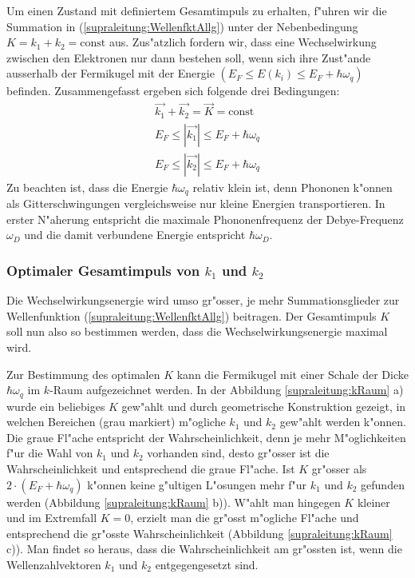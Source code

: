 \begin{refsection}
Um einen Zustand mit definiertem Gesamtimpuls zu erhalten, f"uhren wir die Summation in
(\ref{supraleitung:WellenfktAllg}) unter der Nebenbedingung $K=k_1+k_2=\text{const}$ aus.
Zus"atzlich fordern wir, dass eine Wechselwirkung zwischen den Elektronen nur dann bestehen soll,
wenn sich ihre Zust"ande ausserhalb der Fermikugel mit der Energie
$(E_F \le E(k_i) \le E_F+\hbar\omega_q)$ befinden.
Zusammengefasst ergeben sich folgende drei Bedingungen:
\begin{gather}
\overrightarrow{k_1}+\overrightarrow{k_2}=\overrightarrow{K}=\text{const}
\label{supraleitung:BedingungConst}\\
E_F\le|\overrightarrow{k_1}|\le E_F+\hbar\omega_q
\label{supraleitung:BedingungK1}\\
E_F\le|\overrightarrow{k_2}|\le E_F+\hbar\omega_q
\label{supraleitung:BedingungK2}
\end{gather}
Zu beachten ist, dass die Energie $\hbar \omega_q$ relativ klein ist, denn Phononen k"onnen als Gitterschwingungen vergleichsweise
nur kleine Energien transportieren.
In erster N"aherung entspricht die maximale Phononenfrequenz der  Debye-Frequenz $\omega_D$ und die damit verbundene
Energie entspricht $\hbar \omega_D$.

\subsubsection{Optimaler Gesamtimpuls von $k_1$ und $k_2$}

Die Wechselwirkungsenergie wird umso gr"osser, je mehr Summationsglieder zur Wellenfunktion
(\ref{supraleitung:WellenfktAllg}) beitragen.
Der Gesamtimpuls $K$ soll nun also so bestimmen werden, dass die Wechselwirkungsenergie maximal wird.

Zur Bestimmung des optimalen $K$ kann die Fermikugel mit einer Schale der Dicke
$\hbar\omega_q$ im $k$-Raum aufgezeichnet werden.
In der Abbildung \ref{supraleitung:kRaum} a) wurde ein beliebiges $K$ gew"ahlt und durch
geometrische Konstruktion gezeigt, in welchen Bereichen (grau markiert) m"ogliche $k_1$ und $k_2$
gew"ahlt werden k"onnen.
Die graue Fl"ache entspricht der Wahrscheinlichkeit, denn je mehr M"oglichkeiten f"ur die Wahl
von $k_1$ und $k_2$ vorhanden sind, desto gr"osser ist die Wahrscheinlichkeit und entsprechend
die graue Fl"ache.
Ist $K$ gr"osser als $2\cdot(E_F+\hbar\omega_q)$ k"onnen keine g"ultigen L"osungen mehr
f"ur $k_1$ und $k_2$ gefunden werden (Abbildung \ref{supraleitung:kRaum} b)).
W"ahlt man hingegen $K$ kleiner und im Extremfall $K=0$, erzielt man die gr"osst m"ogliche
Fl"ache und entsprechend die gr"osste Wahrscheinlichkeit (Abbildung \ref{supraleitung:kRaum} c)).
Man findet so heraus, dass die Wahrscheinlichkeit am gr"ossten ist, wenn die
Wellenzahlvektoren $k_1$ und $k_2$ entgegengesetzt sind.


\end{refsection}
